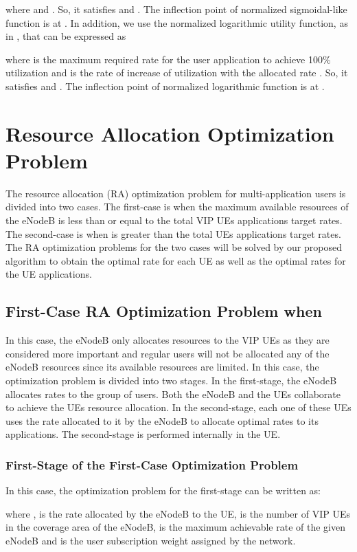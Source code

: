 \documentclass[journal]{IEEEtran} 				\IEEEoverridecommandlockouts 						\usepackage{amsmath,amssymb}
\begin{document}
where  and . So, it satisfies  and . The inflection point of normalized sigmoidal-like function is at .
In addition, we use the normalized logarithmic utility function, as in \cite{Ahmed_Utility1}, that can be expressed as

where  is the maximum required rate for the user application to achieve 100\% utilization and  is the rate of increase of utilization with the allocated rate . So, it satisfies  and . The inflection point of normalized logarithmic function is at .
\section{Resource Allocation Optimization Problem}\label{sec:ResourceAllocation}
The resource allocation (RA) optimization problem for multi-application users is divided into two cases. The first-case is when the maximum available resources  of the eNodeB is less than or equal to the total VIP UEs applications target rates. The second-case is when  is greater than the total UEs applications target rates. The RA optimization problems for the two cases will be solved by our proposed algorithm to obtain the optimal rate for each UE as well as the optimal rates for the UE applications.

\subsection{First-Case RA Optimization Problem when } \label{First-Case-RA}
In this case, the eNodeB only allocates resources to the  VIP UEs as they are considered more important and regular users will not be allocated any of the eNodeB resources since its available resources are limited. In this case, the optimization problem is divided into two stages. In the first-stage, the eNodeB allocates rates  to the  group of users. Both the eNodeB and the  UEs collaborate to achieve the UEs resource allocation. In the second-stage, each one of these  UEs uses the rate allocated to it by the eNodeB to allocate optimal rates  to its   applications. The second-stage is performed internally in the UE.
\subsubsection{First-Stage of the First-Case Optimization Problem}\label{FC-FS-RA}
In this case, the optimization problem for the first-stage can be written as:

where ,  is the rate allocated by the eNodeB to the  UE,  is the number of VIP UEs in the coverage area of the eNodeB,  is the maximum achievable rate of the given eNodeB and  is the  user subscription weight assigned by the network.
\end{document}
